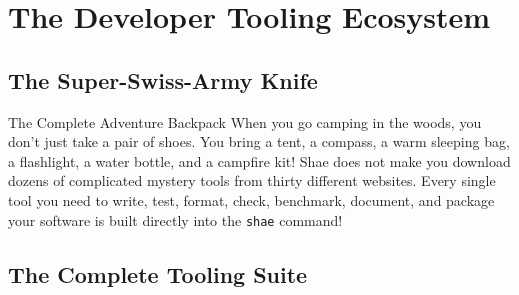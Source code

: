 \chapter{The Developer Tooling Ecosystem}

\section{The Super-Swiss-Army Knife}

\begin{kidbox}{The Complete Adventure Backpack}
When you go camping in the woods, you don't just take a pair of shoes.
You bring a tent, a compass, a warm sleeping bag, a flashlight, a water bottle, and a campfire kit!
Shae does not make you download dozens of complicated mystery tools from thirty different websites.
Every single tool you need to write, test, format, check, benchmark, document, and package your software is built directly into the \texttt{shae} command!
\end{kidbox}

\section{The Complete Tooling Suite}

